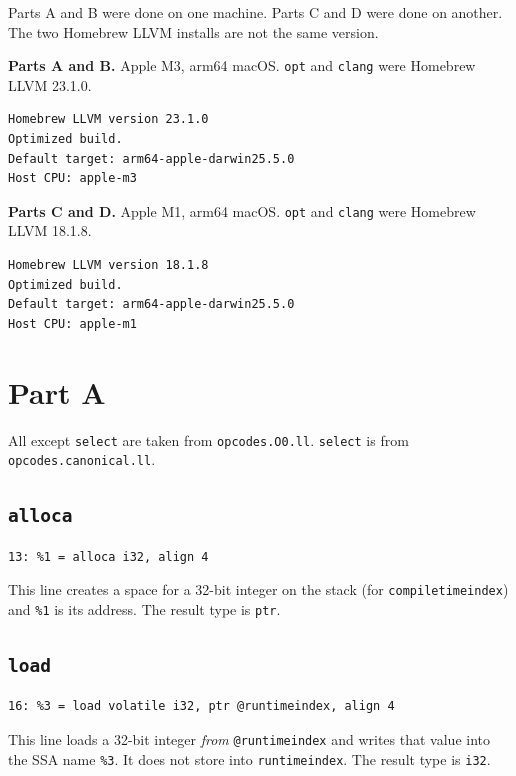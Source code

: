\documentclass[11pt,a4paper]{article}
\begin{document}
Parts A and B were done on one machine. Parts C and D were
done on another. The two Homebrew LLVM installs are not the
same version.

\textbf{Parts A and B.} Apple M3, arm64 macOS. \texttt{opt} and
\texttt{clang} were Homebrew LLVM 23.1.0.

\begin{lstlisting}[language={}]
Homebrew LLVM version 23.1.0
Optimized build.
Default target: arm64-apple-darwin25.5.0
Host CPU: apple-m3
\end{lstlisting}

\textbf{Parts C and D.} Apple M1, arm64 macOS. \texttt{opt} and
\texttt{clang} were Homebrew LLVM 18.1.8.

\begin{lstlisting}[language={}]
Homebrew LLVM version 18.1.8
Optimized build.
Default target: arm64-apple-darwin25.5.0
Host CPU: apple-m1
\end{lstlisting}

\section{Part A}

All except \texttt{select} are taken from \texttt{opcodes.O0.ll}.
\texttt{select} is from \texttt{opcodes.canonical.ll}.

\subsection*{\texttt{alloca}}

\begin{lstlisting}
13: %1 = alloca i32, align 4
\end{lstlisting}

This line creates a space for a 32-bit integer on the stack (for
\texttt{compiletimeindex}) and \texttt{\%1} is its address. The result type is
\texttt{ptr}.

\subsection*{\texttt{load}}

\begin{lstlisting}
16: %3 = load volatile i32, ptr @runtimeindex, align 4
\end{lstlisting}

This line loads a 32-bit integer \emph{from} \texttt{@runtimeindex} and writes
that value into the SSA name \texttt{\%3}. It does not store into
\texttt{runtimeindex}. The result type is \texttt{i32}.
\end{document}
